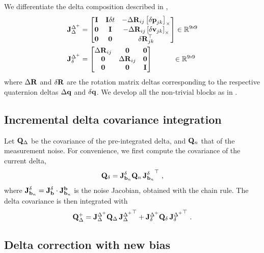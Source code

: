 We differentiate the delta composition  described in ,
%
\begin{subequations}
\begin{align}
{{\bf J}^{\Delta^+}_{\Delta}} &= \begin{bmatrix}
{\bf I}  & {\bf I}\delta t & - {\Delta{\bf R}}_{ij}  \left[{\delta{\bf p}}_{jk}\right]_\times  \\
\bf0  & {\bf I}    & - {\Delta{\bf R}}_{ij}  \left[{\delta{\bf v}}_{jk}\right]_\times \\
\bf0  & \bf0    &   {\delta{\bf R}}_{jk}^{\top} 
\end{bmatrix} 
\in {\mathbb R}^{9\!\times\!9}
\\
{{\bf J}^{\Delta^+}_{\delta}} &= \begin{bmatrix}
{\Delta{\bf R}}_{ij} & \bf0     & \bf0 \\
\bf0     & {\Delta{\bf R}}_{ij} & \bf0 \\
\bf0     & \bf0     & {\bf I}  
\end{bmatrix}
~~~~~~~~~\in {\mathbb R}^{9\!\times\!9}
\end{align}
\end{subequations}
%
where ${\Delta{\bf R}}$ and ${\delta{\bf R}}$ are the rotation matrix deltas corresponding to the respective quaternion deltas ${\Delta{\bf q}}$ and ${\delta{\bf q}}$. 
We develop all the non-trivial blocks as in .


\subsection{Incremental delta covariance integration}

Let ${\bf Q}_\Delta$ be the covariance of the pre-integrated delta, and ${\bf Q}_n$ that of the measurement noise. For convenience, we first compute the covariance of the current delta,
%
\begin{align}
{\bf Q}_\delta =  {{\bf J}^{\delta}_{{\bf b}_n}}{\bf Q}_n\,{{\bf J}^{\delta}_{{\bf b}_n}}^{\top}
~,
\end{align}
%
where ${{\bf J}^{\delta}_{{\bf b}_n}} = {{\bf J}^{\delta}_{{\bf b}}} \cdot {{\bf J}^{{\bf b}}_{{\bf b}_n}}
$ is the noise Jacobian, obtained with the chain rule.
The delta covariance is then integrated with
%
\begin{align}
{\bf Q}_\Delta^+ = {{\bf J}^{\Delta^+}_{\Delta}}{\bf Q}_\Delta\,{{\bf J}^{\Delta^+}_{\Delta}}^{\top} + {{\bf J}^{\Delta^+}_{\delta}}{\bf Q}_\delta\,{{\bf J}^{\Delta^+}_{\delta}}^{\top}
~.
\end{align}




\subsection{Delta correction with new bias}

